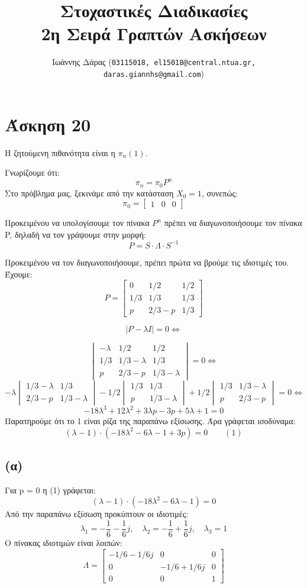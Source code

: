 \documentclass[a4paper,oneside, 11pt]{article}
\title{\textbf{Στοχαστικές Διαδικασίες \\ 2η Σειρά Γραπτών Ασκήσεων}}
\author{ Ιωάννης Δάρας (\texttt{03115018, el15018@central.ntua.gr, daras.giannhs@gmail.com}) \\
}
\date{}
\begin{document}
\maketitle
\noindent\makebox[\linewidth]{\rule{\paperwidth}{0.4pt}}

\section*{Άσκηση 20}
Η ζητούμενη πιθανότητα είναι η $\pi_n(1)$.


Γνωρίζουμε ότι:
$$
\pi_n =  \pi_0 P^n
$$
Στο πρόβλημα μας, ξεκινάμε από την κατάσταση $X_0=1$, συνεπώς:
$$
\pi_0 = \begin{bmatrix}
1 & 0 & 0
\end{bmatrix}
$$

Προκειμένου να υπολογίσουμε τον πίνακα $P^n$ πρέπει να διαγωνοποιήσουμε τον πίνακα P, δηλαδή να τον γράψουμε στην μορφή:
$$
P = S \cdot \Lambda \cdot S^{-1}
$$ 

 Προκειμένου να τον διαγωνοποιήσουμε, πρέπει πρώτα να βρούμε τις ιδιοτιμές του.
Έχουμε:
$$
P = \begin{bmatrix}
0 & 1/2 & 1/2 \\
1/3 & 1/3 & 1/3 \\
p & 2/3 - p & 1/3
\end{bmatrix}
$$

$$
|P - \lambda I| = 0 \iff 
$$


$$
\begin{vmatrix}
-\lambda & 1/2 & 1/2 \\ 
1/3 & 1/3 - \lambda & 1/3 \\
p & 2/3 - p & 1/3 - \lambda 
\end{vmatrix} = 0 \iff 
$$
$$
-\lambda \begin{vmatrix} 1/3 - \lambda &  1/3 \\ 2/3 - p & 1/3 - \lambda \end{vmatrix} - 1/2 \begin{vmatrix} 1/3 & 1/3 \\ p & 1/3 -\lambda \end{vmatrix} + 1/2 \begin{vmatrix}
1/3 & 1/3 -\lambda \\ p & 2/3 -p \end{vmatrix} = 0 \iff 
$$
$$
-18\lambda ^ 3 + 12\lambda^2 + 3\lambda p - 3p + 5\lambda + 1 =0
$$
Παρατηρούμε ότι το 1 είναι ρίζα της παραπάνω εξίσωσης.
Άρα γράφεται ισοδύναμα:
$$
(\lambda - 1) \cdot (-18\lambda^2 - 6\lambda -1 + 3p) = 0 \qquad (1)
$$
\subsection*{(α)}
Για p = 0 η (1) γράφεται:
$$
(\lambda - 1) \cdot (-18\lambda^2 - 6\lambda -1 ) = 0
$$
Από την παραπάνω εξίσωση προκύπτουν οι ιδιοτιμές:
$$
\lambda_1 = -\frac{1}{6} - \frac{1}{6}j, \quad \lambda_2 = -\frac{1}{6} + \frac{1}{6}j, \quad \lambda_3 = 1
$$
Ο πίνακας ιδιοτιμών είναι λοιπών:
$$
\Lambda = \begin{bmatrix}
-1/6 -1/6j & 0 & 0 \\
0 & -1/6 +1/6j & 0 \\
0 & 0 & 1 
\end{bmatrix}
$$
\end{document}
